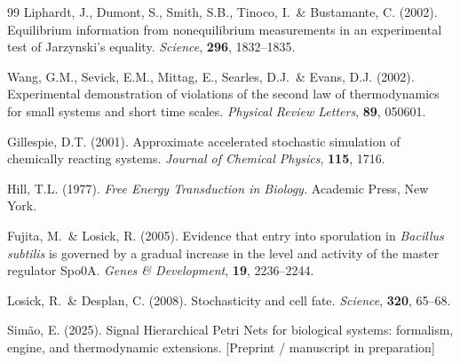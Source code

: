 \documentclass[11pt,a4paper]{article}
\begin{document}
\begin{thebibliography}{99}
  Liphardt, J., Dumont, S., Smith, S.B., Tinoco, I.\ \& Bustamante, C. (2002).
  Equilibrium information from nonequilibrium measurements in an experimental
  test of Jarzynski's equality.
  \textit{Science}, \textbf{296}, 1832--1835.

  Wang, G.M., Sevick, E.M., Mittag, E., Searles, D.J.\ \& Evans, D.J. (2002).
  Experimental demonstration of violations of the second law of thermodynamics
  for small systems and short time scales.
  \textit{Physical Review Letters}, \textbf{89}, 050601.

  Gillespie, D.T. (2001).
  Approximate accelerated stochastic simulation of chemically reacting systems.
  \textit{Journal of Chemical Physics}, \textbf{115}, 1716.

  Hill, T.L. (1977).
  \textit{Free Energy Transduction in Biology.} Academic Press, New York.

  Fujita, M.\ \& Losick, R. (2005).
  Evidence that entry into sporulation in \textit{Bacillus subtilis} is
  governed by a gradual increase in the level and activity of the master
  regulator Spo0A.
  \textit{Genes \& Development}, \textbf{19}, 2236--2244.

  Losick, R.\ \& Desplan, C. (2008).
  Stochasticity and cell fate.
  \textit{Science}, \textbf{320}, 65--68.

  Sim\~{a}o, E. (2025).
  Signal Hierarchical Petri Nets for biological systems: formalism,
  engine, and thermodynamic extensions.
  [Preprint / manuscript in preparation]

\end{thebibliography}
\end{document}
